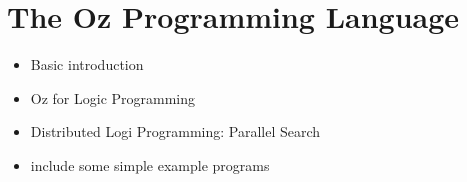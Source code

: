 \section{The Oz Programming Language}

\begin{itemize}
\item Basic introduction \cite{vanroy99mozart} 
\item Oz for Logic Programming \cite{vanroy03mozart_logic} 
\item Distributed Logi Programming: Parallel Search \cite{schulte00oz_parallel} 
\item include some simple example programs 
\end{itemize}
